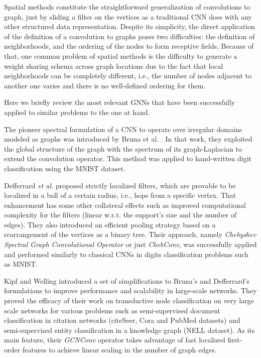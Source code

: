 Spatial methods constitute the straightforward generalization of convolutions to graph, just by sliding a filter on the vertices as a traditional CNN does with any other structured data representation. Despite its simplicity, the direct application of the definition of a convolution to graphs poses two difficulties: the definition of neighborhoods, and the ordering of the nodes to form receptive fields. Because of that, one common problem of spatial methods is the difficulty to generate a weight sharing schema across graph locations due to the fact that local neighborhoods can be completely different, i.e., the number of nodes adjacent to another one varies and there is no well-defined ordering for them.

Here we briefly review the most relevant \acp{GNN} that have been successfully applied to similar problems to the one at hand.

The pioneer spectral formulation of a CNN to operate over irregular domains modeled as graphs was introduced by Bruna et al. \cite{Bruna2013}. In that work, they exploited the global structure of the graph with the spectrum of its graph-Laplacian to extend the convolution operator. This method was applied to hand-written digit classification using the \ac{MNIST} dataset.

Defferrard \emph{et al.} \cite{Defferrard2016} proposed strictly localized filters, which are provable to be localized in a ball of a certain radius, i.e., hops from a specific vertex. That enhancement has some other collateral effects such as improved computational complexity for the filters (linear w.r.t. the support’s size and the number of edges). They also introduced an efficient  pooling strategy based on a rearrangement of the vertices as a binary tree. Their approach, namely \emph{Chebyshev Spectral Graph Convolutional Operator} or just \emph{ChebConv}, was successfully applied and performed similarly to classical \acp{CNN} in digits classification problems such as \acs{MNIST}.

Kipf and Welling \cite{Kipf2016} introduced a set of simplifications to Bruna's \cite{Bruna2013} and Defferrard's \cite{Defferrard2016} formulations to improve performance and scalability in large-scale networks. They proved the efficacy of their work on transductive node classification on very large scale networks for various problems such as semi-supervised document classification in citation networks (citeSeer, Cora and PubMed datasets) and semi-supervised entity classification in a knowledge graph (\acs{NELL} dataset). As its main feature, their \emph{GCNConv} operator takes advantage of fast localized first-order features to achieve linear scaling in the number of graph edges.

